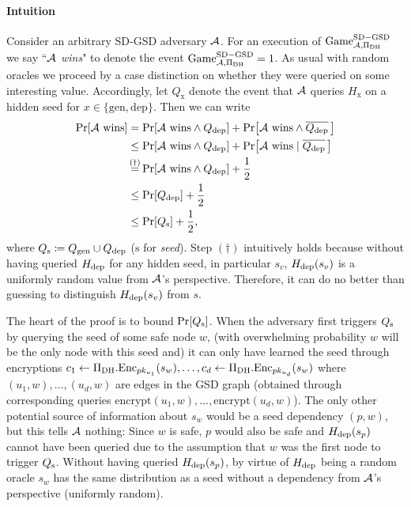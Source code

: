 \paragraph{Intuition}
Consider an arbitrary SD-GSD adversary $\mathcal{A}$. For an execution of $\mathrm{Game}_{\mathcal{A}, \Pi_{\mathrm{DH}}}^{\mathrm{SD-GSD}}$ we say ``\emph{$\mathcal{A}$ wins}" to denote the event $\mathrm{Game}_{\mathcal{A}, \Pi_{\mathrm{DH}}}^{\mathrm{SD-GSD}} = 1$.
As usual with random oracles we proceed by a case distinction on whether they were queried on some interesting value. Accordingly, let $Q_{\mathrm{x}}$ denote the event that $\mathcal{A}$ queries $H_{\mathrm{x}}$ on a hidden seed for $x \in \{\mathrm{gen}, \mathrm{dep}\}$. Then we can write
\begin{align} \label{eq:theorem-sd-gsd-security-win-cases}
	\begin{split}
		\pr{\wins} & = \pr{\wins \land \qdep} + \pr{\wins \land \overline{\qdep} \,} \\
		& \le \pr{\wins \land \qdep} + \pr{\wins \mid \overline{\qdep} \,} \\
		& \stackrel{\mathclap{(\dagger)}}{=}  \pr{\wins \land \qdep} + \frac{1}{2}         \\
		& \le \pr{\qdep} + \frac{1}{2} \\
		& \le \pr{\qs} + \frac{1}{2},
	\end{split}
\end{align}
where $Q_\mathrm{s} \coloneqq Q_\mathrm{gen} \cup Q_\mathrm{dep}$ ($\mathrm{s}$ for \emph{seed}). Step $(\dagger)$ intuitively holds because without having queried $H_\mathrm{dep}$ for any hidden seed, in particular $s_v$, $H_\mathrm{dep}(s_v)$ is a uniformly random value from $\mathcal{A}$'s perspective. Therefore, it can do no better than guessing to distinguish $H_\mathrm{dep}(s_v)$ from $s$.


The heart of the proof is to bound $\pr{\qs}$. When the adversary first triggers $Q_\mathrm{s}$ by querying the seed of some safe node $w$, (with overwhelming probability $w$ will be the only node with this seed and) it can only have learned the seed through encryptions
$c_1 \leftarrow \Pi_{\mathrm{DH}}.\mathrm{Enc}_{pk_{u_1}}(s_w), \ldots, c_d \leftarrow \Pi_{\mathrm{DH}}.\mathrm{Enc}_{pk_{u_d}}(s_w)$
where $(u_1, w), \ldots, (u_d, w)$ are edges in the GSD graph (obtained through corresponding queries $\mathrm{encrypt}(u_1, w), \ldots, \mathrm{encrypt}(u_d, w)$). The only other potential source of information about $s_w$ would be a seed dependency $(p, w)$, but this tells $\mathcal{A}$ nothing: Since $w$ is safe, $p$ would also be safe and $H_\mathrm{dep}(s_p)$ cannot have been queried due to the assumption that $w$ was the first node to trigger $Q_\mathrm{s}$. Without having queried $H_\mathrm{dep}(s_p)$, by virtue of $H_\mathrm{dep}$ being a random oracle $s_w$ has the same distribution as a seed without a dependency from $\mathcal{A}$'s perspective (uniformly random).

